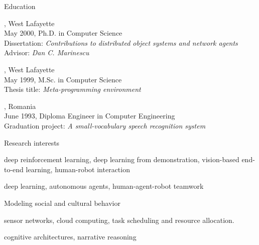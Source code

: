 \documentclass{resume}
\author{Ladislau B{\"o}l{\"o}ni}
\begin{document}
\maketitle



\begin{category}{Education}

, West Lafayette \\
May 2000, Ph.D. in Computer Science \\
Dissertation: {\em Contributions to distributed object systems and network
agents} \\
Advisor: {\em Dan C. Marinescu}

, West Lafayette \\
May 1999, M.Sc. in Computer Science \\
Thesis title: {\em Meta-programming environment}

, Romania\\
June 1993, Diploma Engineer in Computer Engineering \\
Graduation project: {\em A small-vocabulary speech recognition system}

\end{category}



\begin{category}{Research interests}

 deep reinforcement learning, deep learning from demonstration, vision-based end-to-end learning, human-robot interaction

 deep learning, autonomous agents, human-agent-robot teamwork

 Modeling social and cultural behavior

 sensor networks, cloud computing, task scheduling and resource allocation.

 cognitive architectures, narrative reasoning

\end{category}
\end{document}
